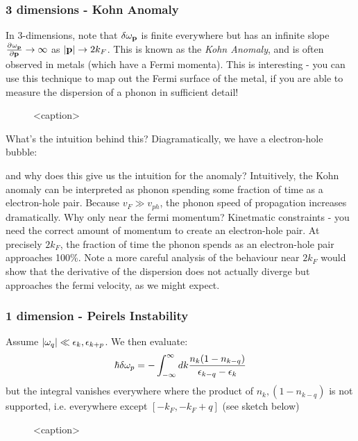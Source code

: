 \subsubsection{3 dimensions - Kohn Anomaly}
In 3-dimensions, note that $\delta \omega_{\mathbf{p}}$ is finite everywhere but has an infinite slope $\pd{\omega_\v{p}}{\v{p}} \to \infty$ as $\lvert \mathbf{p} \rvert \to 2k_F$. This is known as the \emph{Kohn Anomaly}, and is often observed in metals (which have a Fermi momenta). This is interesting - you can use this technique to map out the Fermi surface of the metal, if you are able to measure the dispersion of a phonon in sufficient detail!

\begin{figure}[htbp]
    \centering
    
    \caption{<caption>}
    \label{<label>}
\end{figure}

What's the intuition behind this? Diagramatically, we have a electron-hole bubble:

and why does this give us the intuition for the anomaly? Intuitively, the Kohn anomaly can be interpreted as phonon spending some fraction of time as a electron-hole pair. Because $v_F \gg v_{ph}$, the phonon speed of propagation increases dramatically. Why only near the fermi momentum? Kinetmatic constraints - you need the correct amount of momentum to create an electron-hole pair. At precisely $2k_F$, the fraction of time the phonon spends as an electron-hole pair approaches 100\%. Note a more careful analysis of the behaviour near $2k_F$ would show that the derivative of the dispersion does not actually diverge but approaches the fermi velocity, as we might expect.

\subsubsection{1 dimension - Peirels Instability}
Assume $\lvert \omega_q \rvert \ll \epsilon_k, \epsilon_{k+p}$. We then evaluate:
\begin{equation}
    \hbar \delta \omega_p = -\int_{-\infty}^\infty dk \frac{n_k(1 - n_{k-q})}{\epsilon_{k - q} - \epsilon_k}
\end{equation}
but the integral vanishes everywhere where the product of $n_k, (1 - n_{k-q})$ is not supported, i.e. everywhere except $[-k_F, -k_F + q]$ (see sketch below)

\begin{figure}[htbp]
    \centering
    
    \caption{<caption>}
    \label{<label>}
\end{figure}

